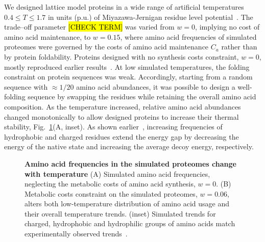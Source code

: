 \documentclass[10pt,letterpaper]{article}
\begin{document}
We designed lattice model proteins in a wide range of artificial temperatures $0.4\leq T\leq 1.7$ in units (p.u.) of Miyazawa-Jernigan residue level potential~\cite{Miyazawa1999SelfConsistent}. The trade--off parameter \hl{[CHECK TERM]} was varied from  $w=0$, implying no cost of amino acid maintenance, to $w=0.15$, where amino acid frequencies of simulated proteomes were governed by the costs of amino acid maintenance $C_{a}$ rather than by protein foldability. Proteins designed with no synthesis costs constraint, $w=0$, mostly reproduced earlier results~\cite{Berezovsky2007Positive,Venev2015Massively}.
At low simulated temperatures, the folding constraint on protein sequences was weak. Accordingly, starting from a random sequence with $\approx 1/20$ amino acid abundances, it was possible to design a well-folding sequence by swapping the residues while retaining the overall amino acid composition.  As the temperature increased, relative amino acid abundances changed monotonically to allow designed proteins to increase their thermal stability, Fig.~\ref{fig:fig3}(A, inset). As shown earlier~\cite{Berezovsky2007Positive}, increasing frequencies of hydrophobic and charged residues extend the energy gap by decreasing the energy of the native state and increasing the average decoy energy, respectively. 


\begin{figure}[h!]
\caption{
{\bf Amino acid frequencies in the simulated proteomes change with temperature} (A) Simulated amino acid frequencies, neglecting the metabolic costs of amino acid synthesis, $w=0$.  (B) Metabolic costs constraint on the simulated proteomes, $w=0.06$, alters both low-temperature distribution of amino acid usage and their overall temperature trends. (inset) Simulated trends for charged, hydrophobic and hydrophilic groups of amino acids match experimentally observed trends~\cite{Berezovsky2007Positive}.
}
\label{fig:fig3}
\end{figure}
\end{document}
